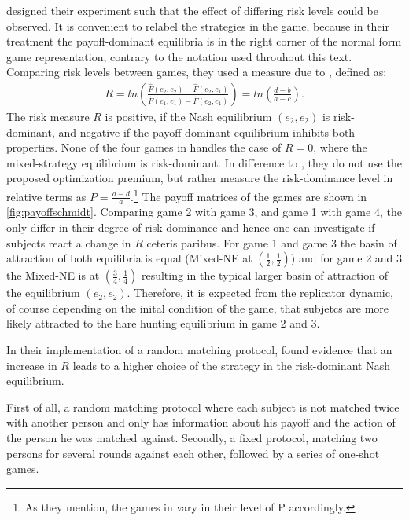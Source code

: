 \textcite{schmidt_playing_2003} designed their experiment such that the effect
of differing risk levels could be observed. It is convenient to relabel 
the strategies in the game, because in their treatment the payoff-dominant 
equilibria is in the right corner of the normal form game representation,
contrary to the notation used throuhout this text. Comparing risk levels between
games, they used a measure due to \textcite{selten_axiomatic_1995}, defined
as:
\begin{align}
        \label{riskmeasureschmidt}
        R = ln\left(\frac{\hat{F}(e_2,e_2) -\hat{F}(e_2,e_1)}{\hat{F}(e_1,e_1) 
        -\hat{F}(e_2,e_1)}\right) = ln \left(\frac{d-b}{a-c}\right).
\end{align}
The risk measure $R$ is positive, if the Nash equilibrium $(e_2,e_2)$ is
risk-dominant, and negative if the payoff-dominant equilibrium inhibits both
properties.
None of the four games in \textcite{schmidt_playing_2003} handles
the case of $R=0$, where the mixed-strategy equilibrium is risk-dominant.
In difference to \textcite{battalio_optimization_2001}, they do not
use the proposed optimization premium, but rather measure the risk-dominance 
level in relative terms as $P=\frac{a-d}{a}$.\footnote{As they mention, the 
games in \textcite{battalio_optimization_2001} vary in their level of 
P accordingly.}
The payoff matrices of the games are shown in \ref{fig:payoffschmidt}.
Comparing game 2 with game 3, and game 1 with game 4, the 
only differ in their degree of risk-dominance and hence one can 
investigate if subjects react a change in $R$ ceteris paribus. 
For game 1 and game 3 the basin of attraction of both equilibria is equal 
(Mixed-NE at $(\frac 12, \frac 12)$) and  for
game 2 and 3 the Mixed-NE is at $(\frac 34,\frac 14)$ resulting in the 
typical  larger basin of attraction of the equilibrium $(e_2,e_2)$. 
Therefore, it is expected from the replicator dynamic, of course 
depending on the inital condition 
of the game, that subjetcs are more likely attracted to the hare hunting 
equilibrium in game 2 and 3.



In their implementation of a random matching protocol, 
\textcite{schmidt_playing_2003} found evidence that an increase in $R$
leads to a higher choice of the strategy in the risk-dominant Nash equilibrium.

First of all, a random matching protocol where each subject is not
matched twice with another person and only has information 
about his payoff and the action of the person he was matched against. 
Secondly, a fixed protocol, matching two persons for several rounds against 
each other, followed by a series of one-shot games. 





